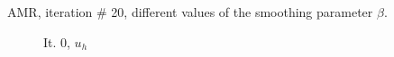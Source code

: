 \documentclass[a4paper,12pt]{amsart}
\numberwithin{equation}{section}
\begin{document}
\begin{figure}[h!]

%
\caption{AMR, iteration \# 20, different values of the smoothing parameter $\beta$.}
\label{fig:amr_lapl_beta3D}
\end{figure}

\begin{figure}[h!]
\centering
\begin{subfigure}[t]{0.35\textwidth}
	\caption{It. 0, $u_h$}
\end{subfigure}
	\hfill
\begin{subfigure}[t]{0.35\textwidth}

\end{subfigure}
\end{figure}
\end{document}
